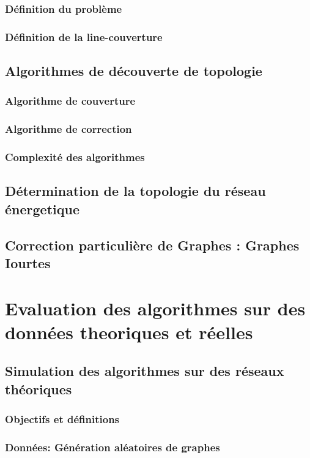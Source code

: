 \documentclass[onecolumn, 12pt]{book}
\begin{document}
		\subsection{D\'efinition du probl\`eme }
		\subsection{D\'efinition de la line-couverture }
	\section{ Algorithmes de d\'ecouverte de topologie}
		\subsection{Algorithme de couverture}
		\subsection{Algorithme de correction}
		\subsection{Complexit\'e des algorithmes}
	\section{D\'etermination de la topologie du r\'eseau \'energetique}
	\section{Correction particuli\`ere de Graphes : Graphes Iourtes }

\chapter{Evaluation des algorithmes sur des donn\'ees theoriques et r\'eelles}
	\section{Simulation des algorithmes sur des r\'eseaux th\'eoriques}
		\subsection{Objectifs et d\'efinitions}
		\subsection{Donn\'ees: G\'en\'eration al\'eatoires de graphes}
\end{document}
